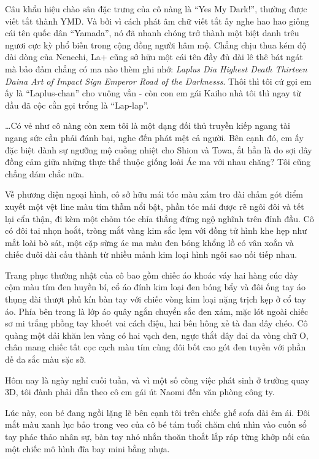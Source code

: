 \documentclass[../main.tex]{subfiles}
\begin{document}
Câu khẩu hiệu chào sân đặc trưng của cô nàng là ``Yes My Dark!'', thường được viết tắt thành YMD. Và bởi vì cách phát âm chữ viết tắt ấy nghe hao hao giống cái tên quốc dân ``Yamada'', nó đã nhanh chóng trở thành một biệt danh trêu ngươi cực kỳ phổ biến trong cộng đồng người hâm mộ. Chẳng chịu thua kém độ dài dòng của Nenechi, La+ cũng sở hữu một cái tên đầy đủ dài lê thê bát ngát mà bảo đảm chẳng có ma nào thèm ghi nhớ: \textit{Laplus Dia Highest Death Thirteen Daina Art of Impact Sign Emperor Road of the Darknesss}. Thôi thì tôi cứ gọi em ấy là ``Laplus-chan'' cho vuông vắn - còn con em gái Kaiho nhà tôi thì ngay từ đầu đã cộc cằn gọi trổng là ``Lap-lap''.

\dots Có vẻ như cô nàng còn xem tôi là một dạng đối thủ truyền kiếp ngang tài ngang sức cần phải đánh bại, nghe đến phát mệt cả người. Bên cạnh đó, em ấy đặc biệt dành sự ngưỡng mộ cuồng nhiệt cho Shion và Towa, ắt hẳn là do sợi dây đồng cảm giữa những thực thể thuộc giống loài Ác ma với nhau chăng? Tôi cũng chẳng dám chắc nữa.

Về phương diện ngoại hình, cô sở hữu mái tóc màu xám tro dài chấm gót điểm xuyết một vệt line màu tím thẫm nổi bật, phần tóc mái được rẽ ngôi đôi và tết lại cẩn thận, đi kèm một chỏm tóc chỉa thẳng đứng ngộ nghĩnh trên đỉnh đầu. Cô có đôi tai nhọn hoắt, tròng mắt vàng kim sắc lẹm với đồng tử hình khe hẹp như mắt loài bò sát, một cặp sừng ác ma màu đen bóng khổng lồ có vân xoắn và chiếc đuôi dài cấu thành từ nhiều mảnh kim loại hình ngôi sao nối tiếp nhau.

Trang phục thường nhật của cô bao gồm chiếc áo khoác váy hai hàng cúc dày cộm màu tím đen huyền bí, cổ áo đính kim loại đen bóng bẩy và đôi ống tay áo thụng dài thượt phủ kín bàn tay với chiếc vòng kim loại nặng trịch kẹp ở cổ tay áo. Phía bên trong là lớp áo quây ngắn chuyển sắc đen xám, mặc lót ngoài chiếc sơ mi trắng phồng tay khoét vai cách điệu, hai bên hông xẻ tà đan dây chéo. Cô quàng một dải khăn len vàng có hai vạch đen, ngực thắt dây đai da vòng chữ O, chân mang chiếc tất cọc cạch màu tím cùng đôi bốt cao gót đen tuyền với phần đế đa sắc màu sặc sỡ.

\chrint

Hôm nay là ngày nghỉ cuối tuần, và vì một số công việc phát sinh ở trường quay 3D, tôi đành phải dẫn theo cô em gái út Naomi đến văn phòng công ty.

Lúc này, con bé đang ngồi lặng lẽ bên cạnh tôi trên chiếc ghế sofa dài êm ái. Đôi mắt màu xanh lục bảo trong veo của cô bé tám tuổi chăm chú nhìn vào cuốn sổ tay phác thảo nhân sự, bàn tay nhỏ nhắn thoăn thoắt lắp ráp từng khớp nối của một chiếc mô hình đĩa bay mini bằng nhựa.
\end{document}
